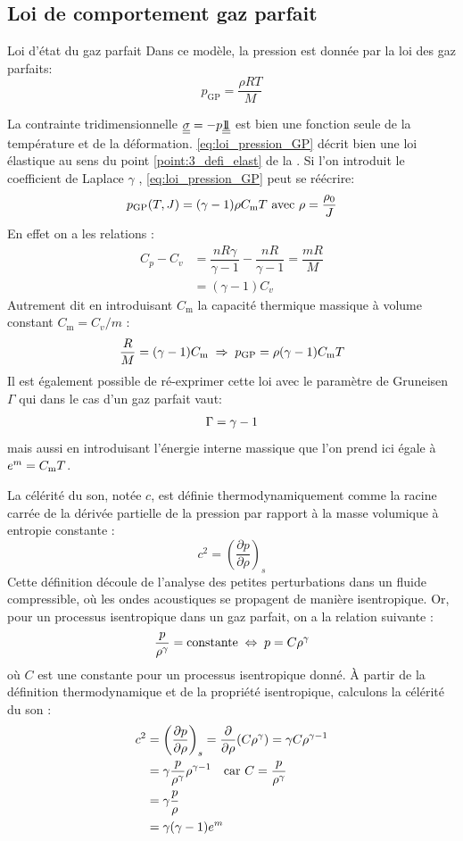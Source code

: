 \documentclass[10pt]{book}
\newcommand{\Cm}{C_{\mathrm{m}}}
\begin{document}
\subsection{Loi de comportement gaz parfait} 
\begin{Defi}{Loi d'état du gaz parfait} Dans ce modèle, la pression est donnée par la loi des gaz parfaits:
\begin{equation}
p_{\mathrm{GP}}=\dfrac{\rho R T}{M}
\label{eq:loi_pression_GP}
\end{equation}
\end{Defi}
La contrainte tridimensionnelle $\underline{\underline{\sigma}} = -p\underline{\underline{1\!\!1}}$ est bien une fonction seule de la température et de la déformation. \eqref{eq:loi_pression_GP} décrit bien une loi élastique au sens du point \ref{point:3_defi_elast} de la .
Si l'on introduit le coefficient de Laplace $\gamma$ , \eqref{eq:loi_pression_GP} peut se réécrire:
$$p_{\mathrm{GP}}(T,\J) = (\gamma - 1)\rho \Cm T\avec \rho = \dfrac{\rho_{0}}{\J}$$
En effet on a les relations :
$$\begin{aligned}
C_{p}-C_{v} &= \dfrac{n R \gamma}{\gamma-1} - \dfrac{n R}{\gamma-1} = \dfrac{m R}{M}\\
&=(\gamma - 1)C_{v}
\end{aligned}$$
Autrement dit en introduisant $\Cm$ la capacité thermique massique à volume constant $\Cm = C_{v}/m$ :
$$\dfrac{R}{M} = (\gamma - 1)\Cm \implique p_{\mathrm{GP}} = \rho(\gamma - 1)\Cm T$$
Il est également possible de ré-exprimer cette loi avec le paramètre de Gruneisen $\Gamma$ qui dans le cas d'un gaz parfait vaut:
$$\Gamma = \gamma - 1$$
mais aussi en introduisant l'énergie interne massique que l'on prend ici égale à $\EIntMass = \Cm T$.

La célérité du son, notée $c$, est définie thermodynamiquement comme la racine carrée de la dérivée partielle de la pression par rapport à la masse volumique à entropie constante :
\begin{equation}
c^2 = \left(\frac{\partial p}{\partial \rho}\right)_s
\end{equation}
Cette définition découle de l'analyse des petites perturbations dans un fluide compressible, où les ondes acoustiques se propagent de manière isentropique. Or, pour un processus isentropique dans un gaz parfait, on a la relation suivante :
$$\frac{p}{\rho^\gamma} = \text{constante} \; \Leftrightarrow \; p = C\rho^\gamma$$
où $C$ est une constante pour un processus isentropique donné. À partir de la définition thermodynamique et de la propriété isentropique, calculons la célérité du son :
$$\begin{aligned}
c^2 &= \left(\frac{\partial p}{\partial \rho}\right)_s = \frac{\partial}{\partial \rho}(C\rho^\gamma)=\gamma C \rho^{\gamma - 1}\\
&= \gamma \frac{p}{\rho^\gamma}\rho^{\gamma-1} \quad \text{car }C = \dfrac{p}{\rho^{\gamma}}\\
&= \gamma \frac{p}{\rho}\\
&= \gamma (\gamma - 1) e^{m}
\end{aligned}$$
\end{document}
